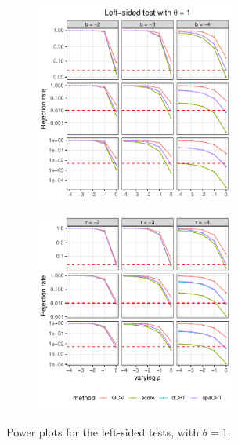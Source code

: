 \documentclass[12pt]{article}
\theoremstyle{definition}
\begin{document}
\begin{figure}
  \centering
  \begin{subfigure}{\textwidth}
    \centering
    \includegraphics[width=0.72\textwidth]{figures-and-tables/simulation/power/plot-bin-NB-normal-B-50000-n-5000-5e3-n5-n5-disp-1-power-fixed-gamma-LEFT.pdf}
  \end{subfigure}

  \begin{subfigure}{\textwidth}
    \centering
    \includegraphics[width=0.72\textwidth]{figures-and-tables/simulation/power/plot-bin-NB-normal-B-50000-n-5000-5e3-n5-n5-disp-1-power-fixed-beta-LEFT.pdf}
  \end{subfigure}

  \caption{Power plots for the left-sided tests, with $\theta = 1$.}
  \label{fig:simulation-power-LEFT-1}
\end{figure}
\end{document}
